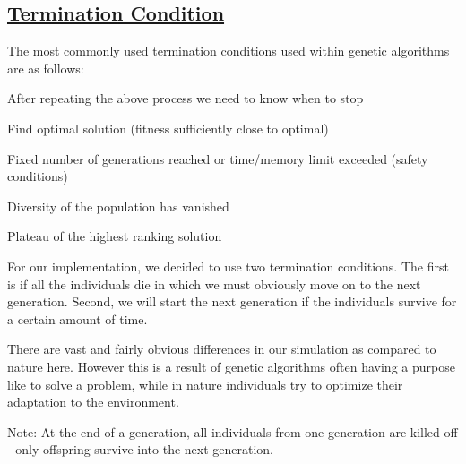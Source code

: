 \newpage
\subsection{\underline{Termination Condition}}

\bi
\item The most commonly used termination conditions used within genetic
algorithms are as follows:
\bi
\item After repeating the above process we need to know when to stop
\item Find optimal solution (fitness sufficiently close to optimal)
\item Fixed number of generations reached or time/memory limit exceeded
(safety conditions)
\item Diversity of the population has vanished
\item Plateau of the highest ranking solution
\ei
\item For our implementation, we decided to use two termination conditions.
The first is if all the individuals die in which we must obviously move
on to the next generation. Second, we will start the next generation if the 
individuals survive for a certain amount of time.
\item There are vast and fairly obvious differences in our simulation as
compared to nature here. However this is a result of genetic algorithms 
often having a purpose like to solve a problem, while in nature individuals
try to optimize their adaptation to the environment.
\ei

\bi
\item Note: At the end of a generation, all individuals from one generation are killed off - only offspring survive into the next generation.
\ei